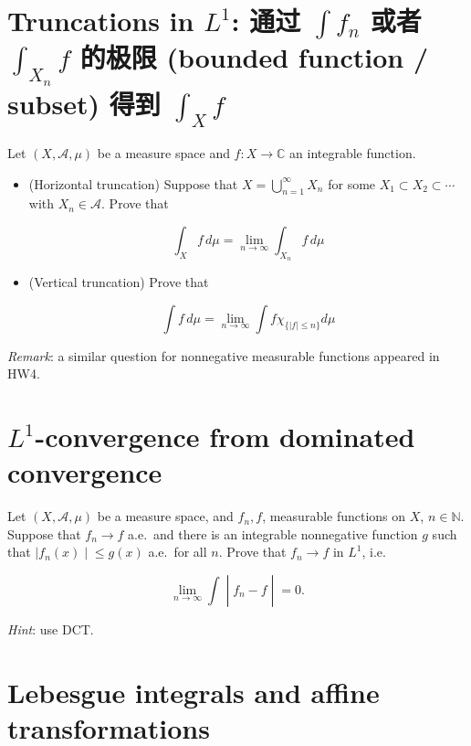 \documentclass{qlnotes-export}
\begin{document}
\section{\texorpdfstring{Truncations in \(L^{1}\): 通过 \(\int f_{n}\) 或者 \(\int_{X_{n}}f\) 的极限 (bounded function / subset) 得到 \(\int_{X}f\)}{Truncations in L\^{}\{1\}: 通过 \textbackslash int f\_\{n\} 或者 \textbackslash int\_\{X\_\{n\}\}f 的极限 (bounded function / subset) 得到 \textbackslash int\_\{X\}f}}\label{truncations-in-l1-ux901aux8fc7-int-f_n-ux6216ux8005-int_x_n-f-ux7684ux6781ux9650-bounded-function-subset-ux5f97ux5230-int_x-f}

Let \((X,\mathcal{A},\mu)\) be a measure space and \(f:X\rightarrow{\mathbb{C}}\) an integrable function.

\begin{itemize}
\item
  (Horizontal truncation) Suppose that \(X = \bigcup_{n = 1}^{\infty}X_{n}\) for some \(X_{1} \subset X_{2} \subset \cdots\) with \(X_{n} \in \mathcal{A}\). Prove that

  \[\int_{X}f\, d\mu = \lim\limits_{n\rightarrow\infty}\int_{X_{n}}f\, d\mu\]
\item
  (Vertical truncation) Prove that

  \[\int f\, d\mu = \lim\limits_{n\rightarrow\infty}\int f\chi_{\{{|f| \leq n}\}} d\mu\]
\end{itemize}

\emph{Remark}: a similar question for nonnegative measurable functions appeared in HW4.

\section{\texorpdfstring{\(L^{1}\)-convergence from dominated convergence}{L\^{}\{1\}-convergence from dominated convergence}}\label{l1-convergence-from-dominated-convergence}

Let \((X,\mathcal{A},\mu)\) be a measure space, and \(f_{n},f\), measurable functions on \(X\), \(n \in {\mathbb{N}}\). Suppose that \(f_{n}\rightarrow f\) a.e.~and there is an integrable nonnegative function \(g\) such that \(\left. |f_{n}(x) \middle| \leq g(x) \right.\) a.e.~for all \(n\). Prove that \(f_{n}\rightarrow f\) in \(L^{1}\), i.e.~

\[\left. \lim\limits_{n\rightarrow\infty}\int \middle| f_{n} - f \middle| = 0. \right.\]

\emph{Hint}: use DCT.

\section{Lebesgue integrals and affine transformations}\label{lebesgue-integrals-and-affine-transformations}
\end{document}
